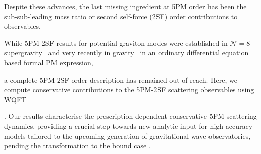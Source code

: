 \documentclass[twocolumn,superscriptaddress,amsmath, amssymb, amsfonts,preprintnumbers,aps,prd,longbibliography,nofootinbib]{revtex4-2}
\begin{document}
Despite these advances, the last missing ingredient at 5PM  order has been the sub-sub-leading mass ratio or second self-force (2SF) order contributions to observables. {While 5PM-2SF results for potential graviton modes were established in  $\mathcal{N}=8$ supergravity~\cite{Bern:2025zno}
and very recently in gravity~\cite{Bern:2025wyd}
in an ordinary differential equation based formal PM expression,

a complete 5PM-2SF order description has remained out of reach.
Here, we compute conservative contributions to the 5PM-2SF scattering observables using WQFT}.
Our results characterise the {prescription-dependent conservative 5PM scattering dynamics,
providing a crucial step towards} new analytic input for high-accuracy
models tailored to the upcoming generation of gravitational-wave observatories,
{pending the transformation to the bound case \cite{Kalin:2019rwq,Kalin:2019inp,Cho:2021arx,Dlapa:2024cje,Dlapa:2025biy}.}
\end{document}
